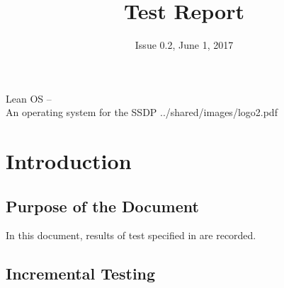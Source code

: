 

\title{Test Report}
\def \documentid {LEANOS-UVIE-TR-001}
\date{Issue 0.2, June 1, 2017}

\newcommand\affil[1]{\textsuperscript#1}

\def\preparedby {Armin Luntzer\affil{1}}
\def\checkedby {Roland Ottensamer\affil{1}}
\def\approvedby {Franz Kerschbaum\affil{1}}

\def\affiliations{
	\affil{1} Department of Astrophysics, University of Vienna
}









\usepackage{fancyvrb}
\usepackage{enumitem}
\usepackage{vhistory}

\usepackage{biblatex}








\setmainfont{MyriadPro-SemiCondensed}
\uvietitlepage%
{Lean OS --\\ An operating system for the SSDP}%
{\doctitle}%
{../shared/images/logo2.pdf}
\setmainfont{MyriadPro}

\approvalpage

\tableofcontents
\newpage



\begin{versionhistory}
\end{versionhistory}


\chapter{Introduction}

\section{Purpose of the Document}

In this document, results of test specified in \cite{leanosTS} are recorded.


\section{Incremental Testing}

